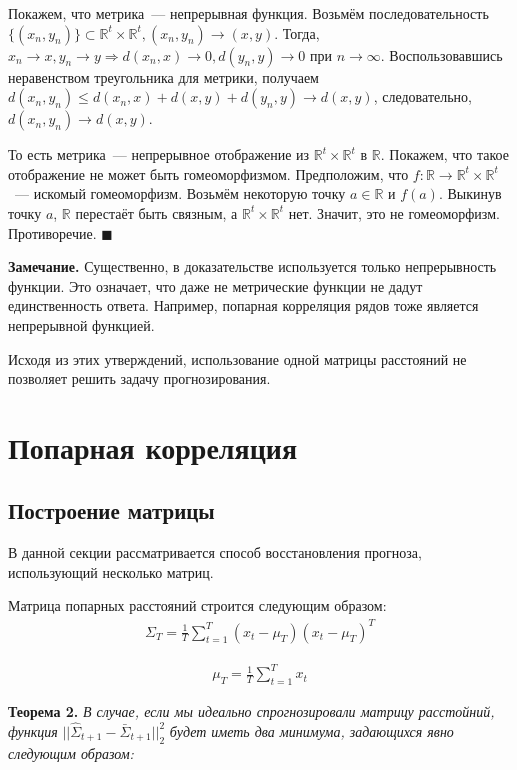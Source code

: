 \documentclass{article}
\begin{document}
Покажем, что метрика~--- непрерывная функция. Возьмём последовательность $\{(x_n, y_n)\} \subset \mathbb{R}^t \times \mathbb{R}^t, (x_n, y_n) \to (x, y)$. Тогда, $x_n\to x, y_n\to y \Rightarrow d(x_n,x)\to 0 ,d(y_n,y)\to 0$ при $n \to \infty$. Воспользовавшись неравенством треугольника для метрики, получаем $d(x_n,y_n)\leq d(x_n,x)+d(x,y)+d(y_n,y)\to d(x,y)$, следовательно, $d(x_n,y_n)\to d(x,y)$.

То есть метрика~--- непрерывное отображение из $\mathbb{R}^t \times \mathbb{R}^t$ в $\mathbb{R}$. Покажем, что такое отображение не может быть гомеоморфизмом. Предположим, что $f: \mathbb{R} \to \mathbb{R}^t \times \mathbb{R}^t$~--- искомый гомеоморфизм. Возьмём некоторую точку $a \in \mathbb{R}$ и $f(a)$. Выкинув точку $a$, $\mathbb{R}$ перестаёт быть связным, а $\mathbb{R}^t \times \mathbb{R}^t$ нет. Значит, это не гомеоморфизм. Противоречие.
$\blacksquare$

\textbf{Замечание.} Существенно, в доказательстве используется только непрерывность функции. Это означает, что даже не метрические функции не дадут единственность ответа. Например, попарная корреляция рядов тоже является непрерывной функцией.

Исходя из этих утверждений, использование одной матрицы расстояний не позволяет решить задачу прогнозирования.

\section{Попарная корреляция}

\subsection{Построение матрицы}

В данной секции рассматривается способ восстановления прогноза, использующий несколько матриц.

Матрица попарных расстояний строится следующим образом:
\begin{gather*}
	{\Sigma}_T = \frac{1}{T} \sum_{t=1}^{T} (x_t - \mu_T)(x_t - \mu_T)^T
\end{gather*}

\begin{gather*}
	\mu_T = \frac{1}{T} \sum_{t=1}^{T} x_t
\end{gather*}

\textbf{Теорема 2.} \textit{В случае, если мы идеально спрогнозировали матрицу расстойний, функция} $||\hat{\Sigma}_{t+1} - \bar{\Sigma}_{t+1}||_2^2$ \textit{будет иметь два минимума, задающихся явно следующим образом:}
\end{document}
